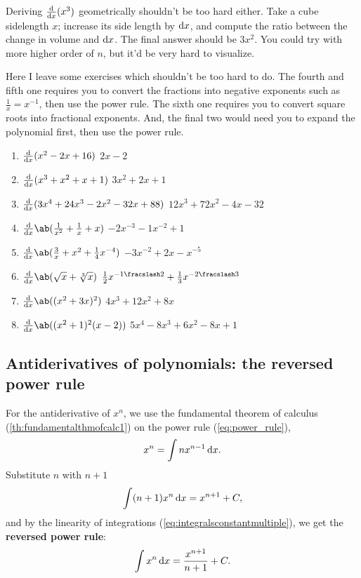 Deriving $\odv*{(x^3)}{x}$ geometrically shouldn't be too hard either. Take a cube sidelength $x$; increase its side length by $\odif{x}$, and compute the ratio between the change in volume and $\odif{x}$. The final answer should be $3x^2$. You could try with more higher order of $n$, but it'd be very hard to visualize.

Here I leave some exercises which shouldn't be too hard to do. The fourth and fifth one requires you to convert the fractions into negative exponents such as $\frac{1}{x} = x^{-1}$, then use the power rule. The sixth one requires you to convert square roots into fractional exponents. And, the final two would need you to expand the polynomial first, then use the power rule.
\begin{enumerate}
  \item $\odv*{(x^2 - 2x + 16)}{x}$ \hfill $2x - 2$
  \item $\odv*{(x^3 + x^2 + x + 1)}{x}$ \hfill $3x^2 + 2x + 1$
  \item $\odv*{(3x^4 + 24x^3 - 2x^2 - 32x + 88)}{x}$ \hfill $12x^3 + 72x^2 - 4x - 32$
  \item $\odv*{\ab(\frac{1}{x^2} + \frac{1}{x} + x)}{x}$ \hfill $-2x^{-3} -1x^{-2} + 1$
  \item $\odv*{\ab(\frac{3}{x} + x^2 + \frac{1}{4}x^{-4})}{x}$ \hfill $-3x^{-2} + 2x - x^{-5}$
  \item $\odv*{\ab(\sqrt{x} + \sqrt[3]{x})}{x}$ \hfill $\frac{1}{2}x^{-\flatfrac{1}{2}} + \frac{1}{3}x^{-\flatfrac{2}{3}}$
  \item $\odv*{\ab((x^2 + 3x)^2)}{x}$ \hfill $4x^3 + 12x^2 + 8x$
  \item $\odv*{\ab((x^2 + 1)^2(x - 2))}{x}$ \hfill $5x^4 - 8x^3 + 6x^2 - 8x + 1$
\end{enumerate}

\subsection{Antiderivatives of polynomials: the reversed power rule}
\label{sec:reversed-power-rule}

For the antiderivative of $x^n$, we use the fundamental theorem of calculus (\cref{th:fundamentalthmofcalc1}) on the power rule (\cref{eq:power_rule}),
\begin{equation*}
  x^n = \int nx^{n - 1} \odif{x}.
\end{equation*}
Substitute $n$ with $n + 1$
\begin{equation*}
  \int (n + 1)x^{n}\odif{x} = x^{n + 1} + C,
\end{equation*}
and by the linearity of integrations (\cref{eq:integralsconstantmultiple}), we get the \textbf{reversed power rule}:
\begin{equation}
  \int x^{n}\odif{x} = \frac{x^{n + 1}}{n + 1} + C. \label{eq:reversed-power-rule}
\end{equation}

